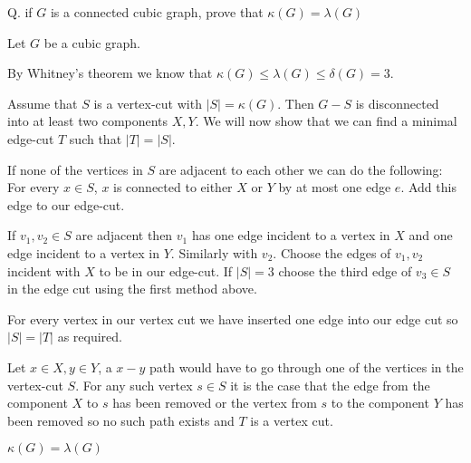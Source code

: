Q. if $G$ is a connected cubic graph, prove that $\kappa(G) = \lambda(G)$

Let $G$ be a cubic graph. 

By Whitney's theorem we know that $\kappa(G) \le \lambda(G) \le \delta(G) = 3 $.

Assume that $S$ is a vertex-cut with $|S| = \kappa(G)$. Then
$G-S$ is disconnected into at least two components $X, Y$. 
We will now show that we can find a minimal edge-cut $T$ such that $|T| = |S|$.

If none of the vertices in $S$ are adjacent to each other we can do the following:
For every $x \in S$, $x$ is connected to either $X$ or $Y$ by at most one edge $e$. 
Add this edge to our edge-cut.

If $v_1, v_2 \in S$ are adjacent then $v_1$ has one edge incident to a vertex 
in $X$ and one edge incident to a vertex in $Y$. Similarly with $v_2$. Choose 
the edges of $v_1, v_2$ incident with $X$ to be in our edge-cut. If $|S| = 3$ 
choose the third edge of $v_3 \in S$ in the edge cut using the first method 
above. 


For every vertex in our vertex cut we have inserted one edge into our edge
cut so $|S| = |T|$ as required. 

Let $x\in X, y \in Y$, a $x-y$ path would have to go through one of the
vertices in the vertex-cut $S$. For any such vertex $s \in S$ it is the
case that the edge from the component $X$ to $s$ has been removed or the
vertex from $s$ to the component $Y$ has been removed so no such path
exists and $T$ is a vertex cut. 

$\kappa(G) = \lambda(G)$
